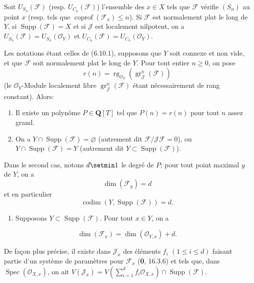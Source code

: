 \begin{corollary}[6.10.4]
\label{IV.2.s6.10.4-fr}
Soit $U_{S_n}(\mathcal F)$ \textup{(resp.} $U_{C_n}(\mathcal F)$) l'ensemble des
$x\in X$ tels que $\mathcal F$ vérifie $(S_n)$ au point $x$ \textup{(resp.} tels que
$\operatorname{coprof}(\mathcal F_x)\leq n$). Si $\mathcal F$ est normalement
plat le long de $Y$, si $\operatorname{Supp}(\mathcal F)=X$ et si $\mathcal J$
est localement nilpotent, on a
$U_{S_n}(\mathcal F)=U_{S_n}(\mathcal O_Y)$ et
$U_{C_n}(\mathcal F)=U_{C_n}(\mathcal O_Y)$.
\end{corollary}

\begin{proposition}[6.10.5]
\label{IV.2.s6.10.5-fr}
Les notations étant celles de \textup{(6.10.1)}, supposons que $Y$ soit connexe et non
vide, et que $\mathcal F$ soit normalement plat le long de $Y$. Pour tout
entier $n\geq0$, on pose
\begin{equation}
r(n)=\operatorname{rg}_{\mathcal O_Y}
(\operatorname{gr}_{\mathcal J}^{n}(\mathcal F))
\tag{6.10.5.1}\label{IV.2.s6.10.5.1-fr}
\end{equation}
(le $\mathcal O_Y$-Module localement libre
$\operatorname{gr}_{\mathcal J}^{n}(\mathcal F)$ étant nécessairement de rang
constant). Alors:
\begin{enumerate}
\item[\textup{(i)}] Il existe un polynôme $P\in\mathbf Q[T]$ tel que $P(n)=r(n)$ pour
tout $n$ assez grand.
\item[\textup{(ii)}] On a $Y\cap\operatorname{Supp}(\mathcal F)=\varnothing$
(autrement dit $\mathcal F/\mathcal J\mathcal F=0$), ou
$Y\cap\operatorname{Supp}(\mathcal F)=Y$ (autrement dit
$Y\subset\operatorname{Supp}(\mathcal F)$).
\end{enumerate}
Dans le second cas, notons $d\setmin 1$ le degré de $P$; pour tout point maximal $y$
de $Y$, on a
\begin{equation}
\dim(\mathcal F_y)=d
\tag{6.10.5.2}\label{IV.2.s6.10.5.2-fr}
\end{equation}
et en particulier
\begin{equation}
\operatorname{codim}(Y,\operatorname{Supp}(\mathcal F))=d.
\tag{6.10.5.3}\label{IV.2.s6.10.5.3-fr}
\end{equation}
\begin{enumerate}
\item[\textup{(iii)}] Supposons $Y\subset\operatorname{Supp}(\mathcal F)$. Pour tout
$x\in Y$, on a
\end{enumerate}
\begin{equation}
\dim(\mathcal F_x)=\dim(\mathcal O_{Y,x})+d.
\tag{6.10.5.4}\label{IV.2.s6.10.5.4-fr}
\end{equation}

De façon plus précise, il existe dans $\mathcal J_x$ des éléments $f_i$
$(1\leq i\leq d)$ faisant partie d'un système de paramètres pour
$\mathcal F_x$ \textup{(\textbf{0}, 16.3.6)} et tels que, dans
$\operatorname{Spec}(\mathcal O_{X,x})$, on ait
$V(\mathcal J_x)=V(\sum_{i=1}^{d}f_i\mathcal O_{X,x})\cap\operatorname{Supp}(\mathcal F)$.
\end{proposition}


